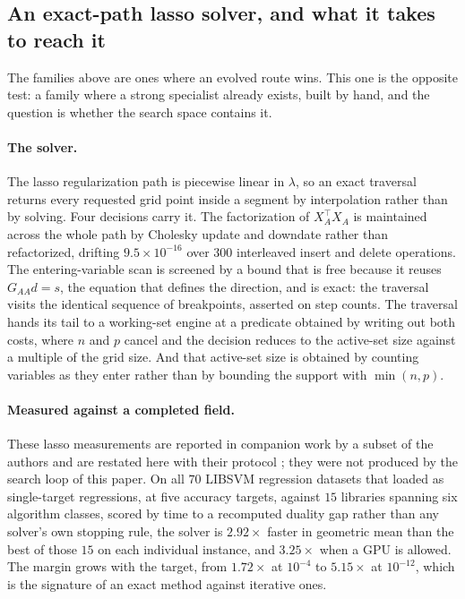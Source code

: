 \subsection{An exact-path lasso solver, and what it takes to reach it}
\label{sec:exp:lasso}

The families above are ones where an evolved route wins. This one is the
opposite test: a family where a strong specialist already exists, built by
hand, and the question is whether the search space contains it.

\paragraph{The solver.} The lasso regularization path is piecewise linear in
$\lambda$, so an exact traversal returns every requested grid point inside a
segment by interpolation rather than by solving. Four decisions carry it. The
factorization of $X_A^\top X_A$ is maintained across the whole path by
Cholesky update and downdate rather than refactorized, drifting
$9.5\times10^{-16}$ over $300$ interleaved insert and delete operations. The
entering-variable scan is screened by a bound that is free because it reuses
$G_{AA}d = s$, the equation that defines the direction, and is exact: the
traversal visits the identical sequence of breakpoints, asserted on step
counts. The traversal hands its tail to a working-set engine at a predicate
obtained by writing out both costs, where $n$ and $p$ cancel and the decision
reduces to the active-set size against a multiple of the grid size. And that
active-set size is obtained by counting variables as they enter rather than by
bounding the support with $\min(n,p)$.

\paragraph{Measured against a completed field.} These lasso measurements are
reported in companion work by a subset of the authors and are restated here
with their protocol \citep{OptiVault2026Lasso}; they were not produced by the
search loop of this paper. On all $70$ LIBSVM regression datasets that loaded
as single-target regressions, at five accuracy targets, against $15$ libraries
spanning six algorithm classes, scored by time to a recomputed duality gap
rather than any solver's own stopping rule, the solver is $2.92\times$ faster
in geometric mean than the best of those $15$ on each individual instance, and
$3.25\times$ when a GPU is allowed. The margin grows with the target, from
$1.72\times$ at $10^{-4}$ to $5.15\times$ at $10^{-12}$, which is the signature
of an exact method against iterative ones.

